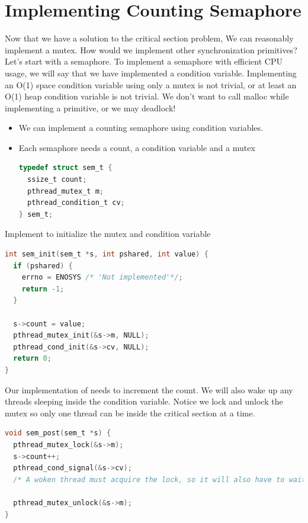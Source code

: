 \section{Implementing Counting Semaphore}

Now that we have a solution to the critical section problem, We can reasonably implement a mutex.
How would we implement other synchronization primitives?
Let's start with a semaphore.
To implement a semaphore with efficient CPU usage, we will say that we have implemented a condition variable.
Implementing an O(1) space condition variable using only a mutex is not trivial, or at least an O(1) heap condition variable is not trivial.
We don't want to call malloc while implementing a primitive, or we may deadlock!

\begin{itemize}
\item
  We can implement a counting semaphore using condition variables.
\item
  Each semaphore needs a count, a condition variable and a mutex
\begin{lstlisting}[language=C]
typedef struct sem_t {
  ssize_t count;
  pthread_mutex_t m;
  pthread_condition_t cv;
} sem_t;
\end{lstlisting}
\end{itemize}

Implement  to initialize the mutex and condition variable

\begin{lstlisting}[language=C]
int sem_init(sem_t *s, int pshared, int value) {
  if (pshared) {
    errno = ENOSYS /* 'Not implemented'*/;
    return -1;
  }

  s->count = value;
  pthread_mutex_init(&s->m, NULL);
  pthread_cond_init(&s->cv, NULL);
  return 0;
}
\end{lstlisting}

Our implementation of  needs to increment the count.
We will also wake up any threads sleeping inside the condition variable.
Notice we lock and unlock the mutex so only one thread can be inside the critical section at a time.

\begin{lstlisting}[language=C]
void sem_post(sem_t *s) {
  pthread_mutex_lock(&s->m);
  s->count++;
  pthread_cond_signal(&s->cv);
  /* A woken thread must acquire the lock, so it will also have to wait until we call unlock*/

  pthread_mutex_unlock(&s->m);
}
\end{lstlisting}

